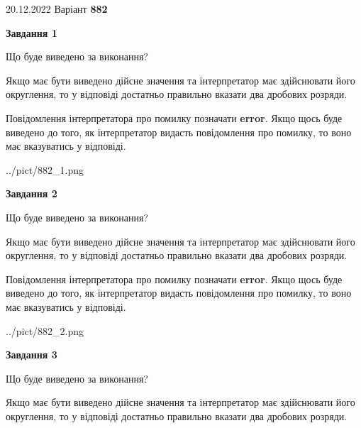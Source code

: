 \documentclass[12pt, ukrainian]{article}
\begin{document}
{20.12.2022 Варіант \No \textbf { 882 }\par}
{
\begin {Large}

{\begin {center}\textbf{Завдання 1}\end {center}}\par
Що буде виведено за виконання? \par

Якщо має бути виведено дійсне значення та інтерпретатор має здійснювати його округлення, 
то у відповіді достатньо правильно вказати два дробових розряди.

Повідомлення інтерпретатора про помилку позначати \textbf{error}.
Якщо щось буде виведено до того, як інтерпретатор видасть повідомлення про помилку, 
то воно має вказуватись у відповіді. \par

\begin{center}
	{../pict/882_1.png}
\end{center}
\newpage

{\begin {center}\textbf{Завдання 2}\end {center}}\par
Що буде виведено за виконання? \par

Якщо має бути виведено дійсне значення та інтерпретатор має здійснювати його округлення, 
то у відповіді достатньо правильно вказати два дробових розряди.

Повідомлення інтерпретатора про помилку позначати \textbf{error}.
Якщо щось буде виведено до того, як інтерпретатор видасть повідомлення про помилку, 
то воно має вказуватись у відповіді. \par

\begin{center}
	{../pict/882_2.png}
\end{center}
\newpage

{\begin {center}\textbf{Завдання 3}\end {center}}\par
Що буде виведено за виконання? \par

Якщо має бути виведено дійсне значення та інтерпретатор має здійснювати його округлення, 
то у відповіді достатньо правильно вказати два дробових розряди.


\end{Large}}
\end{document}
